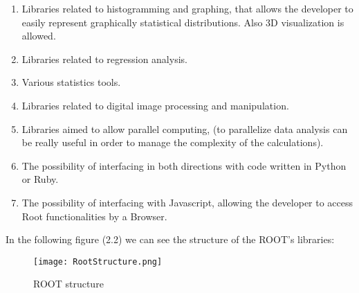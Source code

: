 \begin{enumerate}

\item Libraries related to histogramming and graphing, that allows the developer to easily represent graphically statistical distributions. Also 3D visualization is allowed.

\item Libraries related to regression analysis.

\item Various statistics tools. 

\item Libraries related to digital image processing and manipulation.

\item Libraries aimed to allow parallel computing, (to parallelize data analysis can be really useful in order to manage the complexity of the calculations).

\item The possibility of interfacing in both directions with code written in Python or Ruby.

\item The possibility of interfacing with Javascript, allowing the developer to access Root functionalities by a Browser.

\end{enumerate}

In the following figure (2.2) we can see the structure of the ROOT's libraries:

\begin{figure}[H]
\centering
\texttt{[image: RootStructure.png]} 
\caption{ROOT structure}
\end{figure}


